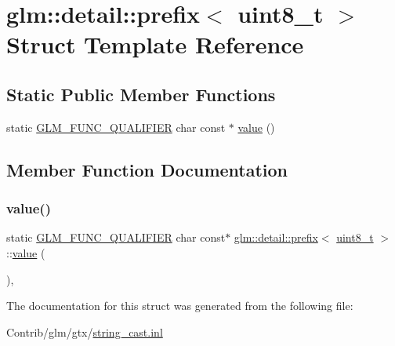 \hypertarget{structglm_1_1detail_1_1prefix_3_01uint8__t_01_4}{}\section{glm\+:\+:detail\+:\+:prefix$<$ uint8\+\_\+t $>$ Struct Template Reference}
\label{structglm_1_1detail_1_1prefix_3_01uint8__t_01_4}
\subsection*{Static Public Member Functions}
\begin{DoxyCompactItemize}
\item 
static \mbox{\hyperlink{setup_8hpp_a33fdea6f91c5f834105f7415e2a64407}{G\+L\+M\+\_\+\+F\+U\+N\+C\+\_\+\+Q\+U\+A\+L\+I\+F\+I\+ER}} char const  $\ast$ \mbox{\hyperlink{structglm_1_1detail_1_1prefix_3_01uint8__t_01_4_a890818b4dedbe09730336c1ae3913339}{value}} ()
\end{DoxyCompactItemize}


\subsection{Member Function Documentation}
\mbox{\label{structglm_1_1detail_1_1prefix_3_01uint8__t_01_4_a890818b4dedbe09730336c1ae3913339}} 
\subsubsection{\texorpdfstring{value()}{value()}}
{\footnotesize\ttfamily static \mbox{\hyperlink{setup_8hpp_a33fdea6f91c5f834105f7415e2a64407}{G\+L\+M\+\_\+\+F\+U\+N\+C\+\_\+\+Q\+U\+A\+L\+I\+F\+I\+ER}} char const$\ast$ \mbox{\hyperlink{structglm_1_1detail_1_1prefix}{glm\+::detail\+::prefix}}$<$ \mbox{\hyperlink{group__gtc__type__precision_ga93adf6dd9803408f3e3aaf9dedda352b}{uint8\+\_\+t}} $>$\+::\mbox{\hyperlink{_s_d_l__opengl__glext_8h_a8ad81492d410ff2ac11f754f4042150f}{value}} (\begin{DoxyParamCaption}{ }\end{DoxyParamCaption})\hspace{0.3cm}{\ttfamily [inline]}, {\ttfamily [static]}}



The documentation for this struct was generated from the following file\+:\begin{DoxyCompactItemize}
\item 
Contrib/glm/gtx/\mbox{\hyperlink{string__cast_8inl}{string\+\_\+cast.\+inl}}\end{DoxyCompactItemize}
